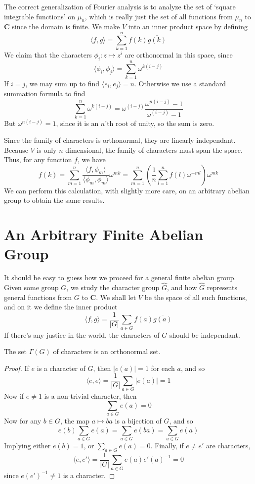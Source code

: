 The correct generalization of Fourier analysis is to analyze the set of `square integrable functions' on $\mu_n$, which is really just the set of all functions from $\mu_n$ to $\mathbf{C}$ since the domain is finite. We make $V$ into an inner product space by defining
%
\[ \langle f, g \rangle = \sum_{k = 1}^n f(k) \overline{g(k)} \]
%
We claim that the characters $\phi_i: z \mapsto z^i$ are orthonormal in this space, since
%
\[ \langle \phi_i, \phi_j \rangle = \sum_{k = 1}^n \omega^{k(i-j)} \]
%
If $i = j$, we may sum up to find $\langle e_i, e_j \rangle = n$. Otherwise we use a standard summation formula to find
%
\[ \sum_{k = 1}^n \omega^{k(i-j)} = \omega^{(i-j)} \frac{\omega^{n(i-j)} - 1}{\omega^{(i-j)} -1} \]
%
But $\omega^{n(i-j)} = 1$, since it is an $n$'th root of unity, so the sum is zero.

Since the family of characters is orthonormal, they are linearly independant. Because $V$ is only $n$ dimensional, the family of characters must span the space. Thus, for any function $f$, we have
%
\[ f(k) = \sum_{m = 1}^n \frac{\langle f, \phi_m \rangle}{\langle \phi_m, \phi_m \rangle} \omega^{mk} = \sum_{m = 1}^n \left( \frac{1}{n} \sum_{l = 1}^n f(l) \omega^{-ml} \right) \omega^{mk} \]
%
We can perform this calculation, with slightly more care, on an arbitrary abelian group to obtain the same results.

\section{An Arbitrary Finite Abelian Group}

It should be easy to guess how we proceed for a general finite abelian group. Given some group $G$, we study the character group $\hat{G}$, and how $\hat{G}$ represents general functions from $G$ to $\mathbf{C}$. We shall let $V$ be the space of all such functions, and on it we define the inner product
%
\[ \langle f, g \rangle = \frac{1}{|G|} \sum_{a \in G} f(a) \overline{g(a)} \]
%
If there's any justice in the world, the characters of $G$ should be independant.

\begin{theorem}
    The set $\Gamma(G)$ of characters is an orthonormal set.
\end{theorem}
\begin{proof}
    If $e$ is a character of $G$, then $|e(a)| = 1$ for each $a$, and so
    \[ \langle e, e \rangle = \frac{1}{|G|} \sum_{a \in G} |e(a)| = 1 \]
    Now if $e \neq 1$ is a non-trivial character, then
    \[ \sum_{a \in G} e(a) = 0 \]
    Now for any $b \in G$, the map $a \mapsto ba$ is a bijection of $G$, and so
    \[ e(b) \sum_{a \in G} e(a) = \sum_{a \in G} e(ba) = \sum_{a \in G} e(a) \]
    Implying either $e(b) = 1$, or $\sum_{a \in G} e(a) = 0$. Finally, if $e \neq e'$ are characters,
    \[ \langle e, e' \rangle = \frac{1}{|G|} \sum_{a \in G} e(a) e'(a)^{-1} = 0 \]
    since $e(e')^{-1} \neq 1$ is a character.
\end{proof}

